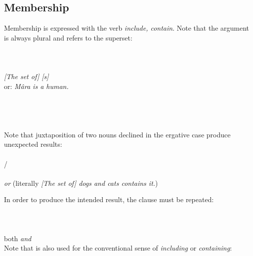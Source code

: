 \documentclass{book}
\begin{document}
\subsection{Membership}

Membership is expressed with the verb  \emph{include, contain}. Note that the  argument is always plural and refers to the superset: \\
~\\
   \\
   \\
\emph{[The set of]  [s] } \\
or: \emph{Mâra is a human.} \\
~\\
   \\
   \\
\emph{  } \\

Note that juxtaposition of two nouns declined in the ergative case produce unexpected results: \\
~\\
 /   \\
   \\
  \emph{or}  (literally \emph{[The set of] dogs and cats contains it.})

In order to produce the intended result, the clause must be repeated: \\
~\\
    \\
    \\
 both  \emph{and}  \\

Note that  is also used for the conventional sense of \emph{including} or \emph{containing}: \\
~\\
   \\
   \\
  
\end{document}
